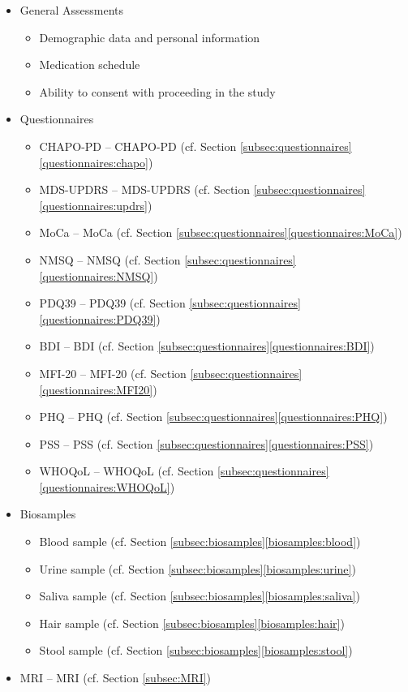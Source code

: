 \begin{itemize}[noitemsep,topsep=0pt]
\item General Assessments
\begin{itemize}[noitemsep,topsep=0pt]
\item Demographic data and personal information
\item Medication schedule
\item Ability to consent with proceeding in the study
\end{itemize}
\item Questionnaires
\begin{itemize}[noitemsep,topsep=0pt]
\item \acl{CHAPO-PD} -- \acs{CHAPO-PD} (cf. Section \ref{subsec:questionnaires}\ref{questionnaires:chapo})
\item \acl{MDS-UPDRS} -- \acs{MDS-UPDRS} (cf. Section \ref{subsec:questionnaires}\ref{questionnaires:updrs})
\item \acl{MoCa} -- \acs{MoCa} (cf. Section \ref{subsec:questionnaires}\ref{questionnaires:MoCa})
\item \acl{NMSQ} -- \acs{NMSQ} (cf. Section \ref{subsec:questionnaires}\ref{questionnaires:NMSQ})
\item \acl{PDQ39} -- \acs{PDQ39} (cf. Section \ref{subsec:questionnaires}\ref{questionnaires:PDQ39})
\item \acl{BDI} -- \acs{BDI} (cf. Section \ref{subsec:questionnaires}\ref{questionnaires:BDI})
\item \acl{MFI-20} -- \acs{MFI-20} (cf. Section \ref{subsec:questionnaires}\ref{questionnaires:MFI20})
\item \acl{PHQ} -- \acs{PHQ} (cf. Section \ref{subsec:questionnaires}\ref{questionnaires:PHQ})
\item \acl{PSS} -- \acs{PSS} (cf. Section \ref{subsec:questionnaires}\ref{questionnaires:PSS})
\item \acl{WHOQoL} -- \acs{WHOQoL} (cf. Section \ref{subsec:questionnaires}\ref{questionnaires:WHOQoL})
\end{itemize}
\item Biosamples
\begin{itemize}[noitemsep,topsep=0pt]
\item Blood sample (cf. Section \ref{subsec:biosamples}\ref{biosamples:blood})
\item Urine sample (cf. Section \ref{subsec:biosamples}\ref{biosamples:urine})
\item Saliva sample (cf. Section \ref{subsec:biosamples}\ref{biosamples:saliva})
\item Hair sample (cf. Section \ref{subsec:biosamples}\ref{biosamples:hair})
\item Stool sample (cf. Section \ref{subsec:biosamples}\ref{biosamples:stool})
\end{itemize}
\item \acl{MRI} -- \acs{MRI} (cf. Section \ref{subsec:MRI}) 
\end{itemize}

